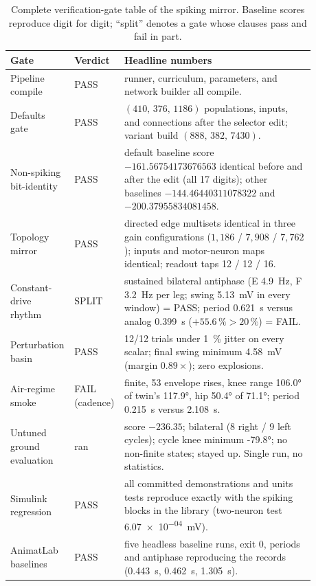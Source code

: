 \begin{table}
\caption{Complete verification-gate table of the spiking mirror. Baseline scores reproduce digit for digit; ``split'' denotes a gate whose clauses pass and fail in part.}
\label{tab:app_spk_gates}
\begin{tabular}{@{}p{0.16\linewidth}p{0.10\linewidth}p{0.62\linewidth}@{}}
\toprule
\textbf{Gate} & \textbf{Verdict} & \textbf{Headline numbers} \\
\midrule
Pipeline compile & PASS & runner, curriculum, parameters, and network builder all compile. \\
Defaults gate & PASS & $(410,\,376,\,1186)$ populations, inputs, and connections after the selector edit; variant build $(888,\,382,\,7430)$. \\
Non-spiking bit-identity & PASS & default baseline score $-161.56754173676563$ identical before and after the edit (all 17 digits); other baselines $-144.46440311078322$ and $-200.37955834081458$. \\
Topology mirror & PASS & directed edge multisets identical in three gain configurations ($1{,}186$ / $7{,}908$ / $7{,}762$); inputs and motor-neuron maps identical; readout taps 12 / 12 / 16. \\
Constant-drive rhythm & SPLIT & sustained bilateral antiphase (E \qty{4.9}{\hertz}, F \qty{3.2}{\hertz} per leg; swing \qty{5.13}{\mV} in every window) = PASS; period \qty{0.621}{\second} versus analog \qty{0.399}{\second} ($+55.6\,\% > 20\,\%$) = FAIL. \\
Perturbation basin & PASS & 12/12 trials under \qty{1}{\percent} jitter on every scalar; final swing minimum \qty{4.58}{\mV} (margin $0.89\times$); zero explosions. \\
Air-regime smoke & FAIL (cadence) & finite, 53 envelope rises, knee range \ang{106.0} of twin's \ang{117.9}, hip \ang{50.4} of \ang{71.1}; period \qty{0.215}{\second} versus \qty{2.108}{\second}. \\
Untuned ground evaluation & ran & score $-236.35$; bilateral (8 right / 9 left cycles); cycle knee minimum \ang{-79.8}; no non-finite states; stayed up. Single run, no statistics. \\
Simulink regression & PASS & all committed demonstrations and units tests reproduce exactly with the spiking blocks in the library (two-neuron test \qty{6.07e-04}{\mV}). \\
AnimatLab baselines & PASS & five headless baseline runs, exit 0, periods and antiphase reproducing the records (\qty{0.443}{\second}, \qty{0.462}{\second}, \qty{1.305}{\second}). \\
\bottomrule
\end{tabular}
\end{table}

